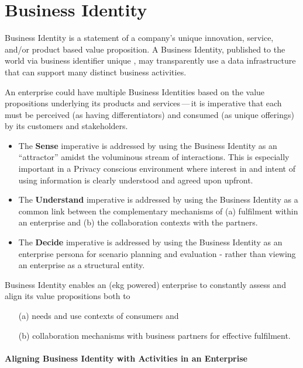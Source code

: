 \section*{Business Identity}

Business Identity is a statement of a company's unique innovation, service, and/or product based value proposition.
A Business Identity, published to the world via business identifier unique ,
may transparently use a data infrastructure that can support many distinct business activities.

An enterprise could have multiple Business Identities based on the value propositions underlying its
products and services\,---\,it is imperative that each must be perceived (as having differentiators) and
consumed (as unique offerings) by its customers and stakeholders.

\begin{itemize}
    \item The \textbf{Sense} imperative is addressed by using the Business Identity as an “attractor” amidst the
          voluminous stream of interactions.
          This is especially important in a Privacy conscious environment where interest in and intent of using
          information is clearly understood and agreed upon upfront.
    \item The \textbf{Understand} imperative is addressed by using the Business Identity as a common link between the
          complementary mechanisms of (a) fulfilment within an enterprise and (b) the collaboration contexts with
          the partners.
    \item The \textbf{Decide} imperative is addressed by using the Business Identity as an enterprise persona for scenario
          planning and evaluation - rather than viewing an enterprise as a structural entity.
\end{itemize}

Business Identity enables an (\gls{ekg} powered) enterprise to constantly assess and align its value propositions
both to

\begin{itemize}
    \item[(a)] needs and use contexts of consumers and
    \item[(b)] collaboration mechanisms with business partners for effective fulfilment.
\end{itemize}

\paragraph*{Aligning Business Identity with Activities in an Enterprise}

